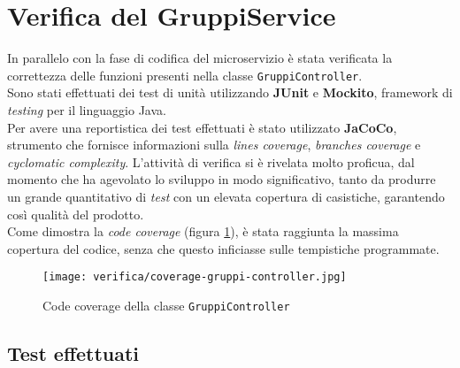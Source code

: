 \section{Verifica del GruppiService}
In parallelo con la fase di codifica del \gls{microservizio}
 è stata verificata la correttezza delle funzioni
presenti nella classe \texttt{GruppiController}. \\
Sono stati effettuati dei test di unità utilizzando \textbf{JUnit} e
\textbf{Mockito}, \gls{framework} di \textit{testing} per il linguaggio Java.\\
Per avere una reportistica dei test effettuati è stato utilizzato
\textbf{JaCoCo}, strumento che fornisce informazioni sulla \textit{lines
      coverage}, \textit{branches coverage} e \textit{cyclomatic complexity}.
L'attività di verifica si è rivelata molto proficua, dal momento che ha agevolato lo sviluppo in
modo significativo, tanto da produrre un grande quantitativo di \textit{test}
con un elevata copertura di casistiche, garantendo così qualità del prodotto.\\
Come dimostra la \textit{code coverage} (figura \ref{img:code-coverage}), è
stata raggiunta la massima copertura del codice, senza che questo inficiasse
sulle tempistiche programmate.

\begin{figure}[H]

      \centerline{\texttt{[image: verifica/coverage-gruppi-controller.jpg]}}

      \caption{Code coverage della classe \texttt{GruppiController}}
      \label{img:code-coverage}
\end{figure}

\subsection{Test effettuati}



